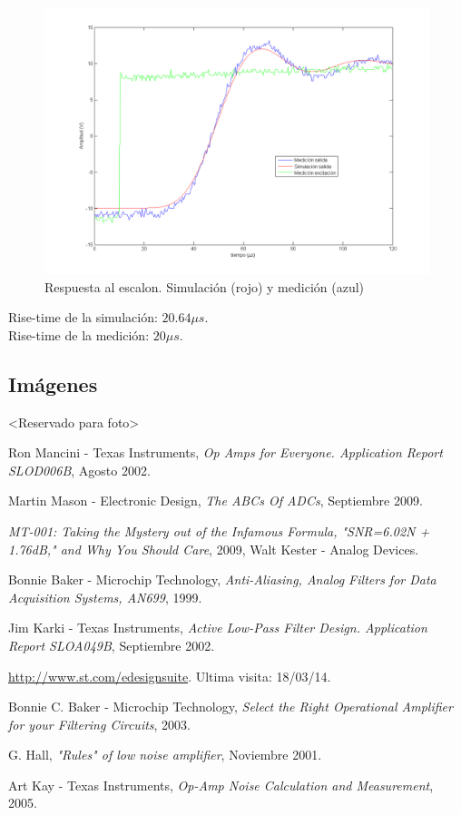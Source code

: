 \documentclass[12pt,a4paper]{article}
\begin{document}
\begin{figure}[H]
\centering
\includegraphics[width=\textwidth]{img/escalon.png}
\caption{Respuesta al escalon. Simulación (rojo) y medición (azul)}
\end{figure}

Rise-time de la simulación: $20.64\mu s$.\\
Rise-time de la medición: $20\mu s$.\\

\subsection{Imágenes}

<Reservado para foto>

\newpage
\begin{thebibliography}{99}

Ron Mancini - Texas Instruments, \textit{Op Amps for Everyone. Application Report SLOD006B}, Agosto 2002.

Martin Mason - Electronic Design, \textit{The ABCs Of ADCs}, Septiembre 2009.

\textit{MT-001: Taking the Mystery out of the Infamous Formula, "SNR=6.02N + 1.76dB," and Why You Should Care}, 2009, Walt Kester - Analog Devices.

Bonnie Baker - Microchip Technology, \textit{Anti-Aliasing, Analog Filters for Data Acquisition Systems, AN699}, 1999.

Jim Karki - Texas Instruments, \textit{Active Low-Pass Filter Design. Application Report SLOA049B}, Septiembre 2002. 

\url{http://www.st.com/edesignsuite}. Ultima visita: 18/03/14.

Bonnie C. Baker - Microchip Technology, \textit{Select the Right Operational Amplifier for your Filtering Circuits}, 2003.

G. Hall, \textit{"Rules" of low noise amplifier}, Noviembre 2001.

Art Kay - Texas Instruments, \textit{Op-Amp Noise Calculation and Measurement}, 2005.

\end{thebibliography}
\end{document}

